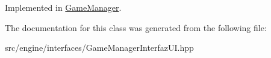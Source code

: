 Implemented in \hyperlink{class_game_manager_a79ed8c7a5bdef1baf9290dcab9b55db2}{Game\+Manager}.



The documentation for this class was generated from the following file\+:\begin{DoxyCompactItemize}
\item 
src/engine/interfaces/Game\+Manager\+Interfaz\+U\+I.\+hpp\end{DoxyCompactItemize}
